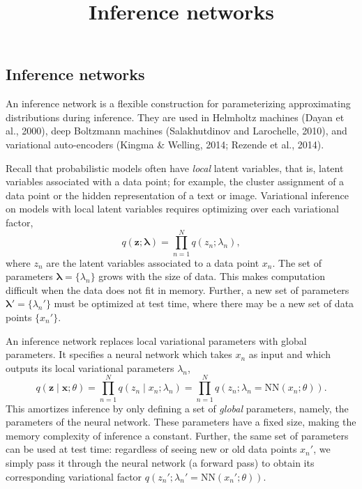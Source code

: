 \title{Inference networks}

\subsection{Inference networks}

An inference network is a flexible construction for parameterizing
approximating distributions during inference.
They are used in Helmholtz machines (Dayan et al., 2000), deep
Boltzmann machines (Salakhutdinov and Larochelle, 2010), and
variational auto-encoders (Kingma & Welling, 2014; Rezende et al.,
2014).

Recall that probabilistic models often have \emph{local} latent
variables, that is, latent variables associated with a data point; for
example, the cluster assignment of a data point or the hidden
representation of a text or image.
Variational
inference on models with local latent variables
requires optimizing over each variational factor,
\begin{equation*}
q(\mathbf{z}; \mathbf{\lambda}) = \prod_{n=1}^N q(z_n; \lambda_n),
\end{equation*}
where $z_n$ are the latent variables associated to a data point $x_n$.
The set of parameters $\mathbf{\lambda}=\{\lambda_n\}$ grows with the
size of data. This makes computation difficult when the data
does not fit in memory.
Further, a new set of parameters $\mathbf{\lambda}'=\{\lambda_n'\}$
must be optimized at test time, where there may be a new set of data
points $\{x_n'\}$.

An inference network replaces local variational parameters with global
parameters. It specifies a neural network
which takes $x_n$ as input and which outputs its local variational parameters
$\lambda_n$,
\begin{equation*}
q(\mathbf{z}\mid \mathbf{x}; \theta)
= \prod_{n=1}^N q(z_n \mid x_n; \lambda_n)
= \prod_{n=1}^N q(z_n; \lambda_n = \mathrm{NN}(x_n; \theta)).
\end{equation*}
This amortizes inference by only defining a set of \emph{global} parameters,
namely, the parameters of the neural network. These parameters have a
fixed size, making the memory complexity of inference a constant.
Further, the same set of parameters can be used at test time:
regardless of seeing new or old data points $x_n'$, we simply pass it
through the neural network (a forward pass) to obtain its
corresponding variational factor $q(z_n'; \lambda_n' =
\mathrm{NN}(x_n'; \theta))$.

